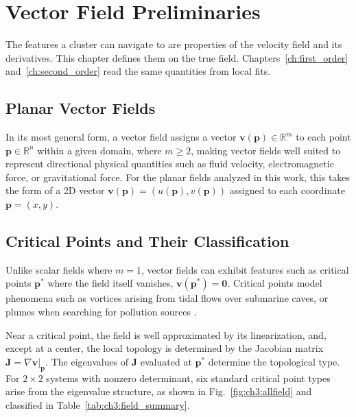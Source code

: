 \chapter{Vector Field Preliminaries}
\label{ch:preliminaries}

The features a cluster can navigate to are properties of the velocity
field and its derivatives. This chapter defines them on the true field.
Chapters~\ref{ch:first_order} and~\ref{ch:second_order} read the same
quantities from local fits.

\section{Planar Vector Fields}
\label{sec:ch3:fields}

In its most general form, a vector field assigns a vector $\mathbf{v}(\mathbf{p}) \in \mathbb{R}^m$ to each point $\mathbf{p} \in \mathbb{R}^n$ within a given domain, where $m \geq 2$, making vector fields well suited to represent directional physical quantities such as fluid velocity, electromagnetic force, or gravitational force. For the planar fields analyzed in this work, this takes the form of a 2D vector $\mathbf{v}(\mathbf{p}) = (u(\mathbf{p}), v(\mathbf{p}))$ assigned to each coordinate $\mathbf{p} = (x, y)$.

\section{Critical Points and Their Classification}
\label{sec:ch3:critical_points}

Unlike scalar fields where $m=1$, vector fields can exhibit features such as critical points $\mathbf{p}^*$ where the field itself vanishes, $\mathbf{v}(\mathbf{p}^*) = \mathbf{0}$. Critical points model phenomena such as vortices arising from tidal flows over submarine caves, or plumes when searching for pollution sources \cite{47}.

Near a critical point, the field is well approximated by its linearization, and, except at a center, the local topology is determined by the Jacobian matrix $\mathbf{J} = \nabla\mathbf{v}|_{\mathbf{p}}$. The eigenvalues of $\mathbf{J}$ evaluated at $\mathbf{p}^*$ determine the topological type. For $2 \times 2$ systems with nonzero determinant, six standard critical point types arise from the eigenvalue structure, as shown in Fig.~\ref{fig:ch3:allfield} and classified in Table~\ref{tab:ch3:field_summary}.

